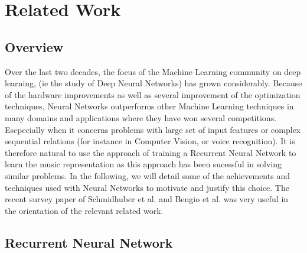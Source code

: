 
\chapter{Related Work} %

\label{Chapter 2} %




\section{Overview}

Over the last two decades, the focus of the Machine Learning community on deep learning, (ie the study of Deep Neural Networks) has grown considerably. Because of the hardware improvements as well as several improvement of the optimization techniques, Neural Networks outperforms other Machine Learning techniques in many domains and applications where they have won several competitions. Escpecially when it concerns problems with large set of input features or complex sequential relations (for instance in Computer Vision, or voice recognition). It is therefore natural to use the approach of training a Recurrent Neural Network to learn the music representation as this approach has been sucessful in solving similar problems. In the following, we will detail some of the achievements and techniques used with Neural Networks to motivate and justify this choice. The recent survey paper of Schmidhuber et al. \cite{schmidhuber2014deep} and Bengio et al.\cite{bengio2013advances} was very useful in the orientation of the relevant related work. 

\newpage
\section{Recurrent Neural Network}

